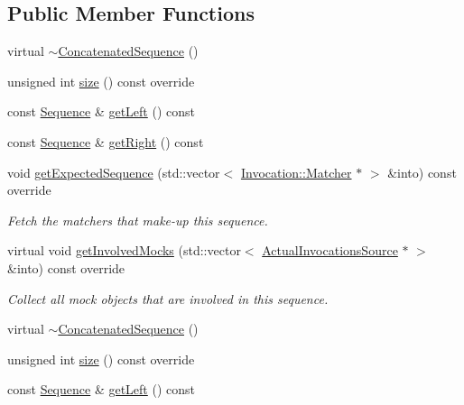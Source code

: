 \subsection*{Public Member Functions}
\begin{DoxyCompactItemize}
\item 
virtual \mbox{\hyperlink{classfakeit_1_1ConcatenatedSequence_a22346ae8c3c2af91f26144338750be25}{$\sim$\+Concatenated\+Sequence}} ()
\item 
unsigned int \mbox{\hyperlink{classfakeit_1_1ConcatenatedSequence_aa1dba1b0274b30626ceab3a743c8105a}{size}} () const override
\item 
const \mbox{\hyperlink{classfakeit_1_1Sequence}{Sequence}} \& \mbox{\hyperlink{classfakeit_1_1ConcatenatedSequence_aee102fbcc892783441a36082e1a22789}{get\+Left}} () const
\item 
const \mbox{\hyperlink{classfakeit_1_1Sequence}{Sequence}} \& \mbox{\hyperlink{classfakeit_1_1ConcatenatedSequence_a7b1ed9161c972e43fdf2e4cfecbe5bd7}{get\+Right}} () const
\item 
void \mbox{\hyperlink{classfakeit_1_1ConcatenatedSequence_a176b1d4dac2e552f646c2c3ce98f0d1f}{get\+Expected\+Sequence}} (std\+::vector$<$ \mbox{\hyperlink{structfakeit_1_1Invocation_1_1Matcher}{Invocation\+::\+Matcher}} $\ast$ $>$ \&into) const override
\begin{DoxyCompactList}\small\item\em Fetch the matchers that make-\/up this sequence. \end{DoxyCompactList}\item 
virtual void \mbox{\hyperlink{classfakeit_1_1ConcatenatedSequence_a3b475e68ab4f750f2d4946e4777ebe30}{get\+Involved\+Mocks}} (std\+::vector$<$ \mbox{\hyperlink{structfakeit_1_1ActualInvocationsSource}{Actual\+Invocations\+Source}} $\ast$ $>$ \&into) const override
\begin{DoxyCompactList}\small\item\em Collect all mock objects that are involved in this sequence. \end{DoxyCompactList}\item 
virtual \mbox{\hyperlink{classfakeit_1_1ConcatenatedSequence_a22346ae8c3c2af91f26144338750be25}{$\sim$\+Concatenated\+Sequence}} ()
\item 
unsigned int \mbox{\hyperlink{classfakeit_1_1ConcatenatedSequence_aa1dba1b0274b30626ceab3a743c8105a}{size}} () const override
\item 
const \mbox{\hyperlink{classfakeit_1_1Sequence}{Sequence}} \& \mbox{\hyperlink{classfakeit_1_1ConcatenatedSequence_aee102fbcc892783441a36082e1a22789}{get\+Left}} () const

\end{DoxyCompactItemize}
